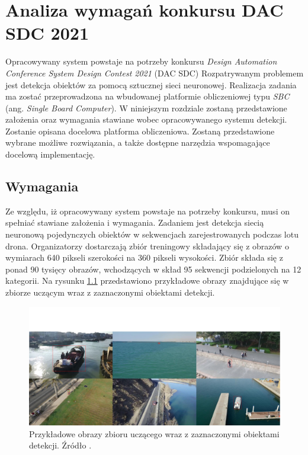 \chapter{Analiza wymagań konkursu DAC SDC 2021}
\label{cha:Analiza probemu}

Opracowywany system powstaje na potrzeby konkursu \emph{Design Automation Conference System Design Contest 2021} (DAC SDC)
Rozpatrywanym problemem jest detekcja obiektów za pomocą sztucznej sieci neuronowej.
Realizacja zadania ma zostać przeprowadzona na wbudowanej platformie obliczeniowej typu \emph{SBC} (ang. \emph{Single Board Computer}).
W niniejszym rozdziale zostaną przedstawione założenia oraz wymagania stawiane wobec opracowywanego systemu detekcji.
Zostanie opisana docelowa platforma obliczeniowa. Zostaną przedstawione wybrane możliwe rozwiązania, 
a także dostępne narzędzia wspomagające docelową implementację.


\section{Wymagania}
Ze względu, iż opracowywany system powstaje na potrzeby konkursu, musi on spełniać stawiane założenia i wymagania.
Zadaniem jest detekcja siecią neuronową pojedynczych obiektów w sekwencjach zarejestrowanych podczas lotu drona.
Organizatorzy dostarczają zbiór treningowy składający się z obrazów o wymiarach 640 pikseli szerokości na 360 pikseli wysokości. Zbiór składa się z ponad 90 tysięcy obrazów, wchodzących w skład 95 sekwencji podzielonych na 12 kategorii. Na rysunku \ref{fig:sample_images} przedstawiono przykładowe obrazy znajdujące się w zbiorze uczącym wraz z zaznaczonymi obiektami detekcji.
\begin{figure}
    \centering
    \includegraphics[width=\linewidth]{images/sample_images.png}
    \caption{Przykładowe obrazy zbioru uczącego wraz z zaznaczonymi obiektami detekcji. Źródło \cite{dac_sdc_2021}.}
    \label{fig:sample_images}
\end{figure}


